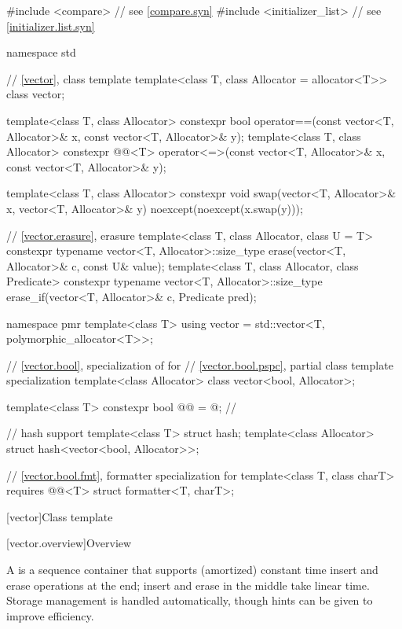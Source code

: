 %
\begin{codeblock}
#include <compare>              // see \ref{compare.syn}
#include <initializer_list>     // see \ref{initializer.list.syn}

namespace std {
  // \ref{vector}, class template 
  template<class T, class Allocator = allocator<T>> class vector;

  template<class T, class Allocator>
    constexpr bool operator==(const vector<T, Allocator>& x, const vector<T, Allocator>& y);
  template<class T, class Allocator>
    constexpr @@<T>
      operator<=>(const vector<T, Allocator>& x, const vector<T, Allocator>& y);

  template<class T, class Allocator>
    constexpr void swap(vector<T, Allocator>& x, vector<T, Allocator>& y)
      noexcept(noexcept(x.swap(y)));

  // \ref{vector.erasure}, erasure
  template<class T, class Allocator, class U = T>
    constexpr typename vector<T, Allocator>::size_type
      erase(vector<T, Allocator>& c, const U& value);
  template<class T, class Allocator, class Predicate>
    constexpr typename vector<T, Allocator>::size_type
      erase_if(vector<T, Allocator>& c, Predicate pred);

  namespace pmr {
    template<class T>
      using vector = std::vector<T, polymorphic_allocator<T>>;
  }

  // \ref{vector.bool}, specialization of  for 
  // \ref{vector.bool.pspc}, partial class template specialization 
  template<class Allocator>
    class vector<bool, Allocator>;

  template<class T>
    constexpr bool @@ = @\seebelow@;          // \expos

  // hash support
  template<class T> struct hash;
  template<class Allocator> struct hash<vector<bool, Allocator>>;

  // \ref{vector.bool.fmt}, formatter specialization for 
  template<class T, class charT> requires @@<T>
    struct formatter<T, charT>;
}
\end{codeblock}

[vector]{Class template }

[vector.overview]{Overview}

\pnum
{}%
A
is a sequence container that supports
(amortized) constant time insert and erase operations at the end;
insert and erase in the middle take linear time.
Storage management is handled automatically, though hints can be given
to improve efficiency.

